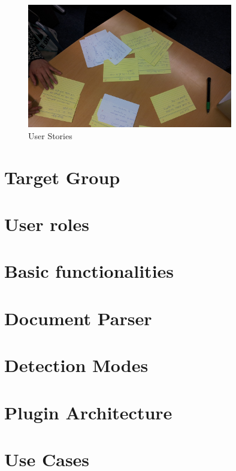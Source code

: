 \begin{figure}[!h]
    \includegraphics[width=0.8\textwidth]{images/2011-11-15-user-stories-4.jpg}
  \caption{User Stories}
  \label{fig:userStories}
\end{figure}

\section{Target Group}

\section{User roles}

\section{Basic functionalities}

\section{Document Parser}

\section{Detection Modes}

\section{Plugin Architecture}

\section{Use Cases}
